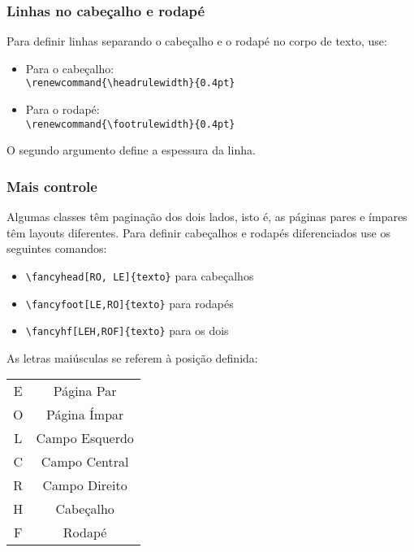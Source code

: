 \documentclass{beamer}
\begin{document}
\begin{frame}[fragile]
\frametitle{Linhas no cabeçalho e rodapé}

Para definir linhas separando o cabeçalho e o rodapé no corpo de texto, use:

\begin{itemize}
 \item Para o cabeçalho: \\ 
	\verb!\renewcommand{\headrulewidth}{0.4pt}!
\item Para o rodapé: \\
	\verb!\renewcommand{\footrulewidth}{0.4pt}!
\end{itemize}

O segundo argumento define a espessura da linha. 

\end{frame}

\begin{frame}[fragile]
\frametitle{Mais controle}

Algumas classes têm paginação dos dois lados, isto é, as páginas pares e ímpares têm layouts diferentes. Para definir cabeçalhos e rodapés diferenciados use os seguintes comandos:

\begin{itemize}
 \item \verb!\fancyhead[RO, LE]{texto}! para cabeçalhos
\item \verb!\fancyfoot[LE,RO]{texto}! para rodapés
\item \verb!\fancyhf[LEH,ROF]{texto}! para os dois
\end{itemize}

As letras maiúsculas se referem à posição definida:

\begin{center}
\begin{footnotesize}
 \begin{tabular}{|c|c|}
 \hline
E & Página Par \\
O & Página Ímpar \\ 
\hline
L & Campo Esquerdo \\
C & Campo Central \\
R & Campo Direito \\ 
\hline
H & Cabeçalho \\
F & Rodapé \\ \hline
\end{tabular}
\end{footnotesize}
\end{center}

\end{frame}
\end{document}
